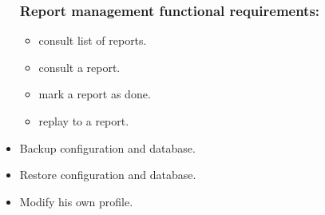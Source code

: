 \documentclass[]{uc2pfecaneva}
\begin{document}
\begin{itemize}
        \subsubsection{Report management functional requirements:}
        \begin{itemize}
            \item consult list of reports.
            \item consult a report.
            \item mark a report as done.
            \item replay to a report.
        \end{itemize}

        \item Backup configuration and database.
        \item Restore configuration and database.
        \item Modify his own profile.
    \end{itemize}
\end{document}
